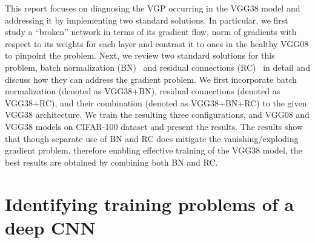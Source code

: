 \documentclass{article}
\begin{document}
This report focuses on diagnosing the VGP occurring in the VGG38 model and addressing it by implementing two standard solutions.
In particular, we first study a ``broken'' network in terms of its gradient flow, norm of gradients with respect to
its weights for each layer and contrast it to ones in the healthy VGG08 to pinpoint the problem.
Next, we review two standard solutions for this problem,  batch normalization (BN)~\cite{ioffe2015batch} and residual connections (RC)~\cite{he2016deep} in detail and discuss how they can address the gradient problem.
We first incorporate batch normalization (denoted as VGG38+BN), residual connections (denoted as VGG38+RC),  and their combination (denoted as VGG38+BN+RC) to the given VGG38 architecture.
We train the resulting three configurations, and VGG08 and VGG38 models on CIFAR-100 dataset and present the results.
The results show that though separate use of BN and RC does mitigate the vanishing/exploding gradient problem, therefore enabling effective training of the VGG38 model, the best results are obtained by combining both BN and RC.

%


\section{Identifying training problems of a deep CNN}
\label{sec:task1}
\end{document}
